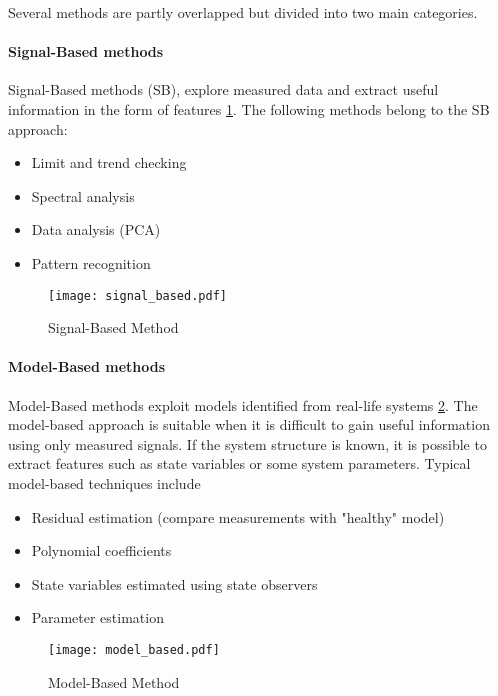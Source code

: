 Several methods are partly overlapped but divided into two main
categories. 

\paragraph{Signal-Based methods} Signal-Based methods (SB), explore measured
data and extract useful information in the form of features
\ref{fig:signal_based}. The following methods belong to the SB approach: 

\begin{itemize}
    \item Limit and trend checking
    \item Spectral analysis
    \item Data analysis (PCA)
    \item Pattern recognition
\end{itemize}

\begin{figure}[h!]
    \centering
    \texttt{[image: signal\_based.pdf]}
    \caption{Signal-Based Method}
    \label{fig:signal_based}
\end{figure}


\paragraph{Model-Based methods} Model-Based methods exploit models identified
from real-life systems \ref{fig:model_based}. The model-based approach is
suitable when it is difficult to gain useful information using only
measured signals. If the system structure is known, it is possible to
extract features such as state variables or some system parameters. Typical
model-based techniques include

\begin{itemize}
    \item Residual estimation (compare measurements with "healthy" model)
    \item Polynomial coefficients
    \item State variables estimated using state observers
    \item Parameter estimation
\end{itemize}

\begin{figure}[h!]
    \centering
    \texttt{[image: model\_based.pdf]}
    \caption{Model-Based Method}
    \label{fig:model_based}
\end{figure}


